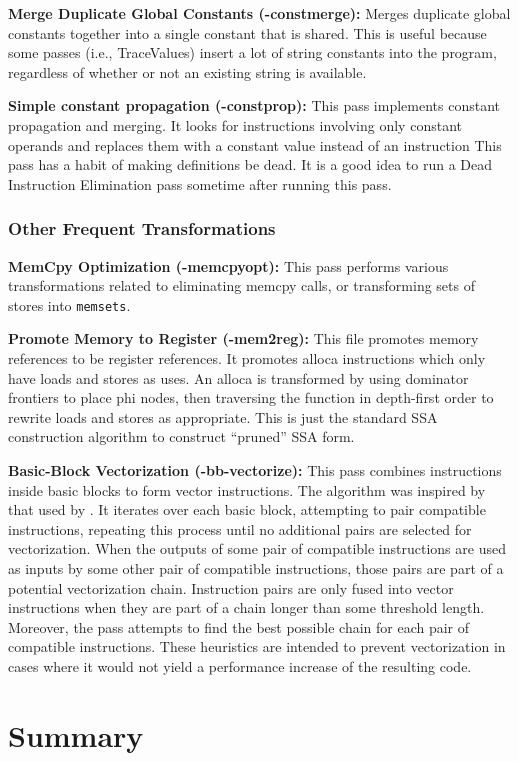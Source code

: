 \noindent\textbf{Merge Duplicate Global Constants ({\flagstype -constmerge}):}
Merges duplicate global constants together into a single constant that is shared. This is useful because some passes (i.e., TraceValues) insert a lot of string constants into the program, regardless of whether or not an existing string is available.

\noindent\textbf{Simple constant propagation ({\flagstype -constprop}):}
This pass implements constant propagation and merging.
It looks for instructions involving only constant operands and replaces them with a constant value instead of an instruction
This pass has a habit of making definitions be dead.
It is a good idea to run a Dead Instruction Elimination pass sometime after running this pass.

\subsubsection{Other Frequent Transformations}

\noindent\textbf{MemCpy Optimization ({\flagstype -memcpyopt}):}
This pass performs various transformations related to eliminating {\flagstype memcpy} calls, or transforming sets of stores into \texttt{memsets}.

\noindent\textbf{Promote Memory to Register ({\flagstype -mem2reg}):}
This file promotes memory references to be register references. It promotes alloca instructions which only have loads and stores as uses. An alloca is transformed by using dominator frontiers to place phi nodes, then traversing the function in depth-first order to rewrite loads and stores as appropriate. This is just the standard SSA construction algorithm to construct “pruned” SSA form.

\noindent\textbf{Basic-Block Vectorization ({\flagstype -bb-vectorize}):}
This pass combines instructions inside basic blocks to form vector instructions.
The algorithm was inspired by that used by \cite{franchetti05}.
It iterates over each basic block, attempting to pair compatible instructions, repeating this process until no additional pairs are selected for vectorization.
When the outputs of some pair of compatible instructions are used as inputs by some other pair of compatible instructions, those pairs are part of a potential vectorization chain.
Instruction pairs are only fused into vector instructions when they are part of a chain longer than some threshold length.
Moreover, the pass attempts to find the best possible chain for each pair of compatible instructions.
These heuristics are intended to prevent vectorization in cases where it would not yield a performance increase of the resulting code.


\section{Summary}

